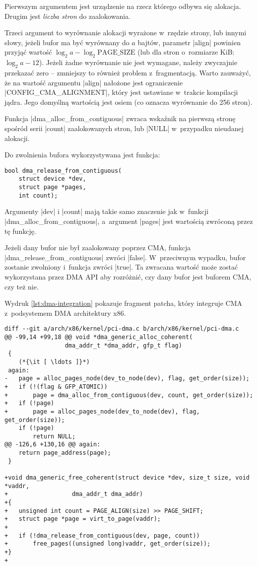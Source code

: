 Pierwszym argumentem jest urządzenie na rzecz którego odbywa się
alokacja.  Drugim jest \emph{liczba stron} do zaalokowania.

Trzeci argument to wyrównanie alokacji wyrażone w~rzędzie strony, lub
innymi słowy, jeżeli bufor ma być wyrównany do $a$ bajtów, parametr
\code|align| powinien przyjąć wartość $\log_2 a - \log_2
\mathrm{PAGE\_SIZE}$ (lub dla stron o~rozmiarze \unit[4096]{KiB}:
$\log_2 a - 12$).  Jeżeli żadne wyrównanie nie jest wymagane, należy
zwyczajnie przekazać zero -- zmniejszy to również problem
z~fragmentacją.  Warto zauważyć, że na wartość argumentu
\code|align| nałożone jest ograniczenie
\code|CONFIG_CMA_ALIGNMENT|, który jest ustawiane w~trakcie
kompilacji jądra.  Jego domyślną wartością jest osiem (co oznacza
wyrównanie do 256 stron).

Funkcja \code|dma_alloc_from_contiguous| zwraca wskaźnik na
pierwszą stronę spośród serii \code|count| zaalokowanych stron,
lub \code|NULL| w~przypadku nieudanej alokacji.

Do zwolnienia bufora wykorzystywana jest funkcja:

\begin{lstlisting}
bool dma_release_from_contiguous(
	struct device *dev,
	struct page *pages,
	int count);
\end{lstlisting}

Argumenty \code|dev| i \code|count| mają takie samo
znaczenie jak w~funkcji \code|dma_alloc_from_contiguous|,
a~argument \code|pages| jest wartością zwróconą przez tę funkcję.

Jeżeli dany bufor nie był zaalokowany poprzez CMA, funkcja
\code|dma_release_from_contiguous| zwróci \code|false|.
W~przeciwnym wypadku, bufor zostanie zwolniony i~funkcja zwróci
\code|true|.  Ta zwracana wartość może zostać wykorzystana przez
DMA API aby rozróżnić, czy dany bufor jest buforem CMA, czy też nie.

Wydruk \ref{lst:dma-integration} pokazuje fragment patcha, który
integruje CMA z~podsystemem DMA architektury x86.

\begin{lstlisting}[float=bht,caption={Integracja CMA z~podsystemem DMA
      architektury x86.},label=lst:dma-integration]
diff --git a/arch/x86/kernel/pci-dma.c b/arch/x86/kernel/pci-dma.c
@@ -99,14 +99,18 @@ void *dma_generic_alloc_coherent(
 				 dma_addr_t *dma_addr, gfp_t flag)
 {
	(*{\it [ \ldots ]}*)
 again:
-	page = alloc_pages_node(dev_to_node(dev), flag, get_order(size));
+	if (!(flag & GFP_ATOMIC))
+		page = dma_alloc_from_contiguous(dev, count, get_order(size));
+	if (!page)
+		page = alloc_pages_node(dev_to_node(dev), flag, get_order(size));
 	if (!page)
 		return NULL;
@@ -126,6 +130,16 @@ again:
 	return page_address(page);
 }

+void dma_generic_free_coherent(struct device *dev, size_t size, void *vaddr,
+			       dma_addr_t dma_addr)
+{
+	unsigned int count = PAGE_ALIGN(size) >> PAGE_SHIFT;
+	struct page *page = virt_to_page(vaddr);
+
+	if (!dma_release_from_contiguous(dev, page, count))
+		free_pages((unsigned long)vaddr, get_order(size));
+}
+
\end{lstlisting}


